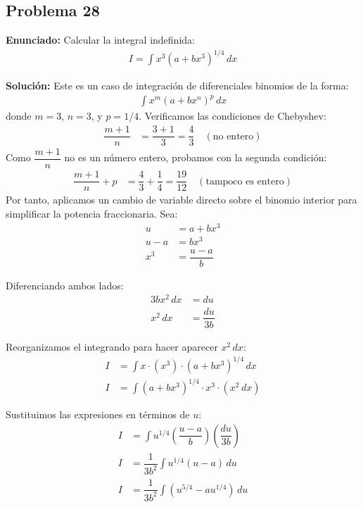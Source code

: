 \subsection*{Problema 28}

\textbf{Enunciado:} 
Calcular la integral indefinida:
\begin{align*}
    I = \int x^3 (a + b x^3)^{1/4} \, dx
\end{align*}

\textbf{Solución:} 
Este es un caso de integración de diferenciales binomios de la forma:
\begin{align*}
    \int x^m (a + b x^n)^p \, dx
\end{align*}
donde $m = 3$, $n = 3$, y $p = 1/4$. 
Verificamos las condiciones de Chebyshev:
\begin{align*}
    \dfrac{m + 1}{n} &= \dfrac{3 + 1}{3} = \dfrac{4}{3} \quad (\text{no entero})
\end{align*}
Como $\dfrac{m + 1}{n}$ no es un número entero, probamos con la segunda condición:
\begin{align*}
    \dfrac{m + 1}{n} + p &= \dfrac{4}{3} + \dfrac{1}{4} = \dfrac{19}{12} \quad (\text{tampoco es entero})
\end{align*}
Por tanto, aplicamos un cambio de variable directo sobre el binomio interior para simplificar la potencia fraccionaria. Sea:
\begin{align*}
    u &= a + b x^3 \\
    u - a &= b x^3 \\
    x^3 &= \dfrac{u - a}{b}
\end{align*}

Diferenciando ambos lados:
\begin{align*}
    3 b x^2 \, dx &= du \\
    x^2 \, dx &= \dfrac{du}{3 b}
\end{align*}

Reorganizamos el integrando para hacer aparecer $x^2 \, dx$:
\begin{align*}
    I &= \int x \cdot (x^3) \cdot (a + b x^3)^{1/4} \, dx \\
    I &= \int (a + b x^3)^{1/4} \cdot x^3 \cdot (x^2 \, dx)
\end{align*}

Sustituimos las expresiones en términos de $u$:
\begin{align*}
    I &= \int u^{1/4} \left( \dfrac{u - a}{b} \right) \left( \dfrac{du}{3 b} \right) \\
    I &= \dfrac{1}{3 b^2} \int u^{1/4} (u - a) \, du \\
    I &= \dfrac{1}{3 b^2} \int (u^{5/4} - a u^{1/4}) \, du
\end{align*}

